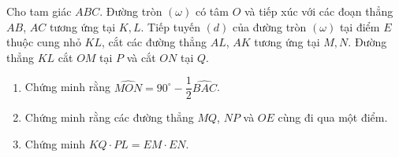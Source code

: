 \begin{ex}%
    Cho tam giác $ABC$. Đường tròn $(\omega)$ có tâm $O$ và tiếp xúc với các đoạn thẳng $AB$, $AC$ tương ứng tại $K,L$. Tiếp tuyến $(d)$ của đường tròn $(\omega)$ tại điểm $E$ thuộc cung nhỏ $KL$, cắt các đường thẳng $AL$, $AK$ tương ứng tại $M,N$. Đường thẳng $KL$ cắt $OM$ tại $P$ và cắt $ON$ tại $Q$.
    \begin{enumerate}
        \item Chứng minh rằng $\widehat{MON}=90^\circ-\dfrac{1}{2}\widehat{BAC}$.
        \item Chứng minh rằng các đường thẳng $MQ$, $NP$ và $OE$ cùng đi qua một điểm.
        \item Chứng minh $KQ\cdot PL=EM\cdot EN$.
    \end{enumerate}
	\loigiai
    {
    \begin{center}
\end{center}}
\end{ex}

